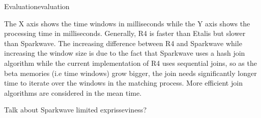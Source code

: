 \begin{nestedsection}{Evaluation}{evaluation}
\begin{figure}
	\end{figure}
	The X axis shows the time windows in milliseconds while the Y axis shows the processing time in milliseconds.
	Generally, R4 is faster than Etalis but slower than Sparkwave.
	The increasing difference between R4 and Sparkwave while increasing the window size is due to the fact that Sparkwave uses a hash join algorithm while the current implementation of R4 uses sequential joins, so as the beta memories (i.e time windows) grow bigger, the join needs significantly longer time to iterate over the windows in the matching process.
	More efficient join algorithms are considered in the mean time.

	Talk about Sparkwave limited exprisseviness?

\end{nestedsection}